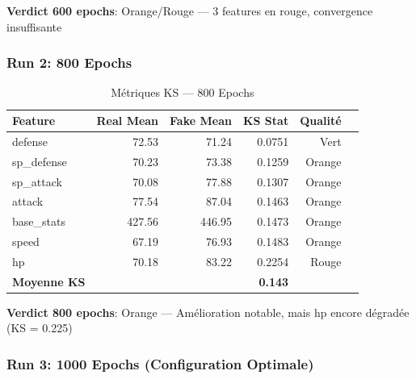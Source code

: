 \documentclass[11pt,a4paper]{article}
\begin{document}
\textbf{Verdict 600 epochs}: Orange/Rouge — 3 features en rouge, convergence insuffisante

\subsubsection{Run 2: 800 Epochs}

\begin{table}[H]
\centering
\caption{Métriques KS — 800 Epochs}
\small
\begin{tabular}{lrrrrr}
\toprule
\textbf{Feature} & \textbf{Real Mean} & \textbf{Fake Mean} & \textbf{KS Stat} & \textbf{Qualité} \\
\midrule
defense & 72.53 & 71.24 & 0.0751 & \cellcolor{green!20}Vert \\
sp\_defense & 70.23 & 73.38 & 0.1259 & \cellcolor{yellow!30}Orange \\
sp\_attack & 70.08 & 77.88 & 0.1307 & \cellcolor{yellow!30}Orange \\
attack & 77.54 & 87.04 & 0.1463 & \cellcolor{yellow!30}Orange \\
base\_stats & 427.56 & 446.95 & 0.1473 & \cellcolor{yellow!30}Orange \\
speed & 67.19 & 76.93 & 0.1483 & \cellcolor{yellow!30}Orange \\
hp & 70.18 & 83.22 & 0.2254 & \cellcolor{red!20}Rouge \\
\midrule
\textbf{Moyenne KS} & & & \textbf{0.143} & \\
\bottomrule
\end{tabular}
\end{table}

\textbf{Verdict 800 epochs}: Orange — Amélioration notable, mais hp encore dégradée (KS = 0.225)

\subsubsection{Run 3: 1000 Epochs (Configuration Optimale)}
\end{document}

